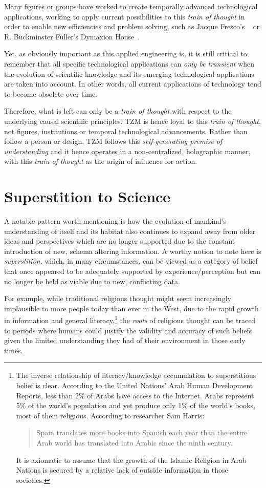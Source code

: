 \documentclass[10pt, a4paper, cleardoubleempty, openright, twoside]{book}
\begin{document}
Many figures or groups have worked to create temporally advanced
technological applications, working to apply current possibilities to
this \emph{train of thought} in order to enable new efficiencies and
problem solving, such as Jacque Fresco's ~\cite[ch.~ 15]{Fresco::02} or R. Buckminster Fuller's Dymaxion
House~\cite{Fuller:http:14}.

Yet, as obviously important as this applied engineering is, it is still
critical to remember that all specific technological applications can
\emph{only be transient} when the evolution of scientific knowledge and
its emerging technological applications are taken into account. In other
words, all current applications of technology tend to become obsolete
over time.

Therefore, what is left can only be a \emph{train of thought} with
respect to the underlying causal scientific principles. TZM is hence
loyal to this \emph{train of thought}, not figures, institutions or
temporal technological advancements. Rather than follow a person or
design, TZM follows this \emph{self-generating premise of understanding}
and it hence operates in a non-centralized, holographic manner, with
this \emph{train of thought} as the origin of influence for action.

\section {Superstition to Science}

A notable pattern worth mentioning is how the evolution of mankind's
understanding of itself and its habitat also continues to expand away
from older ideas and perspectives which are no longer supported due to
the constant introduction of new, schema altering information. A worthy
notion to note here is \emph{superstition}, which, in many
circumstances, can be viewed as a category of belief that once appeared
to be adequately supported by experience/perception but can no longer be
held as viable due to new, conflicting data.

For example, while traditional religious thought might seem increasingly
implausible to more people today than ever in the West, due to the rapid
growth in information and general literacy,\footnote{
	The inverse relationship of literacy/knowledge accumulation to
	superstitious belief is clear. According to the United Nations' Arab
	Human Development Reports, less than 2\% of Arabs have access to the
	Internet. Arabs represent 5\% of the world's population and yet produce
	only 1\% of the world's books, most of them religious. According to
	researcher Sam Harris: \blockquote{Spain translates more books into
	Spanish each year than the entire Arab world has translated into
	Arabic since the ninth century.} It is axiomatic to assume that the
	growth of the Islamic Religion in Arab Nations is secured by a
	relative lack of outside information in those societies.	
} 
the \emph{roots} of religious thought can be traced to periods where
humans could justify the validity and accuracy of such beliefs given the
limited understanding they had of their environment in those early
times.
\end{document}
